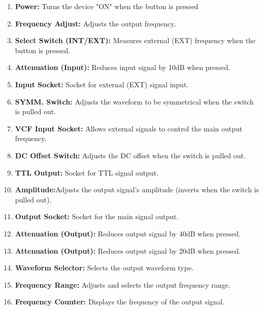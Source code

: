 \documentclass[12pt]{article}
\begin{document}
\begin{enumerate}
    \item \textbf{Power:} Turns the device "ON" when the button is pressed
    \item \textbf{Frequency Adjust:} Adjusts the output frequency.
    \item \textbf{Select Switch (INT/EXT):} \cite{signal}Measures external (EXT) frequency when the button is pressed.
    \item \textbf{Attenuation (Input):} Reduces input signal by 10dB when pressed.
    \item \textbf{Input Socket:} \cite{signal}Socket for external (EXT) signal input.
    \item \textbf{SYMM. Switch:} Adjusts the waveform to be symmetrical when the switch is pulled out.
    \item \textbf{VCF Input Socket:} \cite{signal}Allows external signals to control the main output frequency.
    \item \textbf{DC Offset Switch:} \cite{signal}Adjusts the DC offset when the switch is pulled out.
    \item \textbf{TTL Output:} \cite{signal}Socket for TTL signal output.
    \item \textbf{Amplitude:}Adjusts the output signal's amplitude (inverts when the switch is pulled out).
    \item \textbf{Output Socket:} Socket for the main signal output.
    \item \textbf{Attenuation (Output):} Reduces output signal by 40dB when pressed.
    \item \textbf{Attenuation (Output):} Reduces output signal by 20dB when pressed.
    \item \textbf{Waveform Selector:} Selects the output waveform type.
    \item \textbf{Frequency Range:} Adjusts and selects the output frequency range.
    \item \textbf{Frequency Counter:} Displays the frequency of the output signal.
\end{enumerate}
\end{document}
